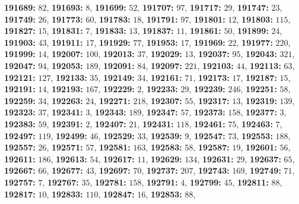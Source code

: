\textsf{\bfseries 191689:} $82$, \textsf{\bfseries 191693:} $8$, \textsf{\bfseries 191699:} $52$, \textsf{\bfseries 191707:} $97$, \textsf{\bfseries 191717:} $29$, \textsf{\bfseries 191747:} $23$, \textsf{\bfseries 191749:} $26$, \textsf{\bfseries 191773:} $60$, \textsf{\bfseries 191783:} $18$, \textsf{\bfseries 191791:} $97$, \textsf{\bfseries 191801:} $12$, \textsf{\bfseries 191803:} $115$, \textsf{\bfseries 191827:} $15$, \textsf{\bfseries 191831:} $7$, \textsf{\bfseries 191833:} $13$, \textsf{\bfseries 191837:} $11$, \textsf{\bfseries 191861:} $50$, \textsf{\bfseries 191899:} $24$, \textsf{\bfseries 191903:} $43$, \textsf{\bfseries 191911:} $17$, \textsf{\bfseries 191929:} $77$, \textsf{\bfseries 191953:} $17$, \textsf{\bfseries 191969:} $22$, \textsf{\bfseries 191977:} $220$, \textsf{\bfseries 191999:} $14$, \textsf{\bfseries 192007:} $100$, \textsf{\bfseries 192013:} $37$, \textsf{\bfseries 192029:} $13$, \textsf{\bfseries 192037:} $95$, \textsf{\bfseries 192043:} $321$, \textsf{\bfseries 192047:} $94$, \textsf{\bfseries 192053:} $189$, \textsf{\bfseries 192091:} $84$, \textsf{\bfseries 192097:} $221$, \textsf{\bfseries 192103:} $44$, \textsf{\bfseries 192113:} $63$, \textsf{\bfseries 192121:} $127$, \textsf{\bfseries 192133:} $35$, \textsf{\bfseries 192149:} $34$, \textsf{\bfseries 192161:} $71$, \textsf{\bfseries 192173:} $17$, \textsf{\bfseries 192187:} $15$, \textsf{\bfseries 192191:} $14$, \textsf{\bfseries 192193:} $167$, \textsf{\bfseries 192229:} $2$, \textsf{\bfseries 192233:} $29$, \textsf{\bfseries 192239:} $246$, \textsf{\bfseries 192251:} $58$, \textsf{\bfseries 192259:} $34$, \textsf{\bfseries 192263:} $24$, \textsf{\bfseries 192271:} $218$, \textsf{\bfseries 192307:} $55$, \textsf{\bfseries 192317:} $13$, \textsf{\bfseries 192319:} $139$, \textsf{\bfseries 192323:} $37$, \textsf{\bfseries 192341:} $3$, \textsf{\bfseries 192343:} $189$, \textsf{\bfseries 192347:} $57$, \textsf{\bfseries 192373:} $158$, \textsf{\bfseries 192377:} $3$, \textsf{\bfseries 192383:} $59$, \textsf{\bfseries 192391:} $2$, \textsf{\bfseries 192407:} $21$, \textsf{\bfseries 192431:} $118$, \textsf{\bfseries 192461:} $75$, \textsf{\bfseries 192463:} $7$, \textsf{\bfseries 192497:} $119$, \textsf{\bfseries 192499:} $46$, \textsf{\bfseries 192529:} $33$, \textsf{\bfseries 192539:} $9$, \textsf{\bfseries 192547:} $73$, \textsf{\bfseries 192553:} $188$, \textsf{\bfseries 192557:} $26$, \textsf{\bfseries 192571:} $57$, \textsf{\bfseries 192581:} $163$, \textsf{\bfseries 192583:} $58$, \textsf{\bfseries 192587:} $19$, \textsf{\bfseries 192601:} $56$, \textsf{\bfseries 192611:} $186$, \textsf{\bfseries 192613:} $54$, \textsf{\bfseries 192617:} $11$, \textsf{\bfseries 192629:} $134$, \textsf{\bfseries 192631:} $29$, \textsf{\bfseries 192637:} $65$, \textsf{\bfseries 192667:} $66$, \textsf{\bfseries 192677:} $43$, \textsf{\bfseries 192697:} $70$, \textsf{\bfseries 192737:} $207$, \textsf{\bfseries 192743:} $169$, \textsf{\bfseries 192749:} $71$, \textsf{\bfseries 192757:} $7$, \textsf{\bfseries 192767:} $35$, \textsf{\bfseries 192781:} $158$, \textsf{\bfseries 192791:} $4$, \textsf{\bfseries 192799:} $45$, \textsf{\bfseries 192811:} $88$, \textsf{\bfseries 192817:} $10$, \textsf{\bfseries 192833:} $110$, \textsf{\bfseries 192847:} $16$, \textsf{\bfseries 192853:} $88$, 
